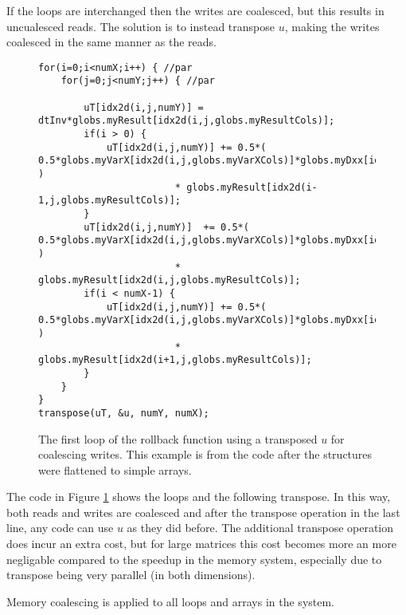 If the loops are interchanged then the writes are coalesced, but this results in uncualesced reads. The solution is to instead transpose $u$, making the writes coalesced in the same manner as the reads.

\begin{figure}[H]
    \begin{lstlisting}
for(i=0;i<numX;i++) { //par
    for(j=0;j<numY;j++) { //par

        uT[idx2d(i,j,numY)] = dtInv*globs.myResult[idx2d(i,j,globs.myResultCols)];
        if(i > 0) {
            uT[idx2d(i,j,numY)] += 0.5*( 0.5*globs.myVarX[idx2d(i,j,globs.myVarXCols)]*globs.myDxx[idx2d(i,0,globs.myDxxCols)] )
                        * globs.myResult[idx2d(i-1,j,globs.myResultCols)];
        }
        uT[idx2d(i,j,numY)]  += 0.5*( 0.5*globs.myVarX[idx2d(i,j,globs.myVarXCols)]*globs.myDxx[idx2d(i,1,globs.myDxxCols)] )
                        * globs.myResult[idx2d(i,j,globs.myResultCols)];
        if(i < numX-1) {
            uT[idx2d(i,j,numY)] += 0.5*( 0.5*globs.myVarX[idx2d(i,j,globs.myVarXCols)]*globs.myDxx[idx2d(i,2,globs.myDxxCols)] )
                        * globs.myResult[idx2d(i+1,j,globs.myResultCols)];
        }
    }
}
transpose(uT, &u, numY, numX);
    \end{lstlisting}
    \caption{The first loop of the rollback function using a transposed $u$ for
    coalescing writes. This example is from the code after the structures were
    flattened to simple arrays.}
    \label{code:coal2}
\end{figure}

The code in Figure \ref{code:coal2} shows the loops and the following transpose.
In this way, both reads and writes are coalesced and after the transpose
operation in the last line, any code can use $u$ as they did before. The
additional transpose operation does incur an extra cost, but for large matrices
this cost becomes more an more negligable compared to the speedup in the memory
system, especially due to transpose being very parallel (in both dimensions).

Memory coalescing is applied to all loops and arrays in the system.